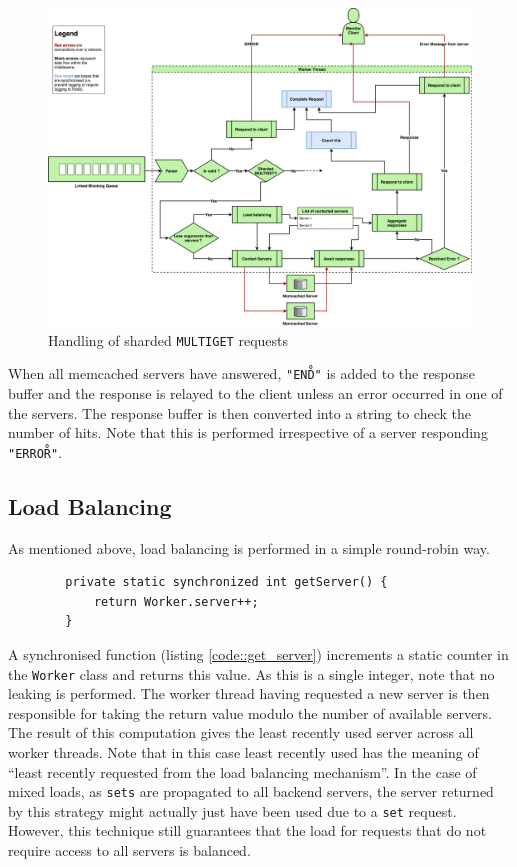 \documentclass[11pt,a4paper]{article}
\newenvironment{code}{\captionsetup{type=listing}}{}
\begin{document}
\begin{figure}[h]
    \centering
    \includegraphics[width=\textwidth]{processing/graphics/multigets_handling.png}
    \caption{Handling of sharded \texttt{MULTIGET} requests}
    \label{png::multigets_handling}
\end{figure}
When all memcached servers have answered, \texttt{"END\r\n"} is added to the response buffer and the response is relayed to the client unless an error occurred in one of the servers. The response buffer is then converted into a string to check the number of hits. Note that this is performed irrespective of a server responding \texttt{"ERROR\r\n"}.

\subsection{Load Balancing}
As mentioned above, load balancing is performed in a simple round-robin way.
\begin{code}
    \label{code::get_server}
    \begin{verbatim}
        private static synchronized int getServer() {
            return Worker.server++;
        }
    \end{verbatim}
\end{code}
A synchronised function (listing \ref{code::get_server}) increments a static counter in the \texttt{Worker} class and returns this value. As this is a single integer, note that no leaking is performed. The worker thread having requested a new server is then responsible for taking the return value modulo the number of available servers. The result of this computation gives the least recently used server across all worker threads. Note that in this case least recently used has the meaning of ``least recently requested from the load balancing mechanism''. In the case of mixed loads, as \texttt{sets} are propagated to all backend servers, the server returned by this strategy might actually just have been used due to a \texttt{set} request. However, this technique still guarantees that the load for requests that do not require access to all servers is balanced.
\end{document}
